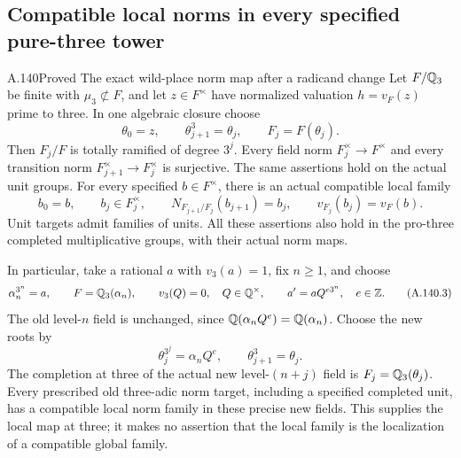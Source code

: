 \subsection{Compatible local norms in every specified pure-three tower}

\begin{statement}{A.140}{Proved}
{The exact wild-place norm map after a radicand change}
Let \(F/\mathbb Q_3\) be finite with \(\mu_3\not\subset F\),
and let \(z\in F^\times\) have normalized valuation
\(h=v_F(z)\) prime to three.
In one algebraic closure choose
\[
 \theta_0=z,\qquad \theta_{j+1}^3=\theta_j,\qquad
                         F_j=F(\theta_j).
\tag{A.140.1}
\]
Then \(F_j/F\) is totally ramified of degree \(3^j\).
Every field norm \(F_j^\times\to F^\times\) and
every transition norm
\(F_{j+1}^\times\to F_j^\times\) is surjective.
The same assertions hold on the actual unit groups.
For every specified \(b\in F^\times\), there is an
actual compatible local family
\[
 b_0=b,\qquad b_j\in F_j^\times,\qquad
 N_{F_{j+1}/F_j}(b_{j+1})=b_j,\qquad
                         v_{F_j}(b_j)=v_F(b).
\tag{A.140.2}
\]
Unit targets admit families of units.
All these assertions also hold in the pro-three
completed multiplicative groups, with their
actual norm maps.

In particular, take a rational \(a\) with \(v_3(a)=1\),
fix \(n\ge1\), and choose
\[
 \alpha_n^{3^n}=a,\qquad
 F=\mathbb Q_3(\alpha_n),\qquad v_3(Q)=0,\quad Q\in\mathbb Q^\times,
 \qquad a'=aQ^{e3^n},\quad e\in\mathbb Z .
\tag{A.140.3}
\]
The old level-\(n\) field is unchanged, since
\(\mathbb Q(\alpha_nQ^e)=\mathbb Q(\alpha_n)\).
Choose the new roots by
\[
       \theta_j^{3^j}=\alpha_nQ^e,\qquad
                      \theta_{j+1}^3=\theta_j .
\tag{A.140.4}
\]
The completion at three of the actual new
level-\((n+j)\) field is \(F_j=\mathbb Q_3(\theta_j)\).
Every prescribed old three-adic norm target,
including a specified completed unit, has a
compatible local norm family in these precise
new fields.
This supplies the local map at three; it makes
no assertion that the local family is the
localization of a compatible global family.
\end{statement}
